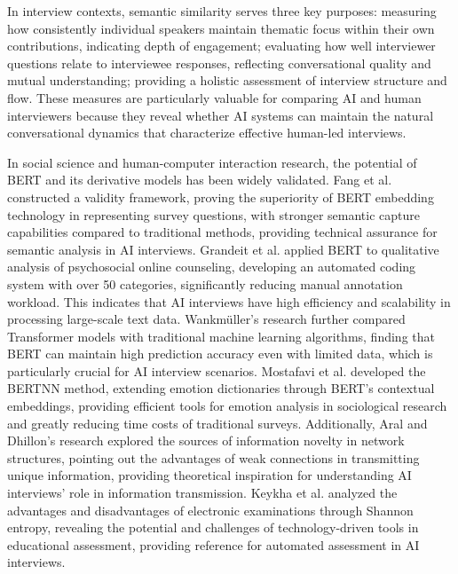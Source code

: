 \documentclass[sigchi,nonacm,manuscript]{acmart}
\begin{document}
In interview contexts, semantic similarity serves three key purposes: measuring how consistently individual speakers maintain thematic focus within their own contributions, indicating depth of engagement; evaluating how well interviewer questions relate to interviewee responses, reflecting conversational quality and mutual understanding; providing a holistic assessment of interview structure and flow. These measures are particularly valuable for comparing AI and human interviewers because they reveal whether AI systems can maintain the natural conversational dynamics that characterize effective human-led interviews.

In social science and human-computer interaction research, the potential of BERT and its derivative models has been widely validated. Fang et al. \citep{fangEvaluatingConstructValidity2022} constructed a validity framework, proving the superiority of BERT embedding technology in representing survey questions, with stronger semantic capture capabilities compared to traditional methods, providing technical assurance for semantic analysis in AI interviews. Grandeit et al. \citep{grandeitUsingBERTQualitative2020} applied BERT to qualitative analysis of psychosocial online counseling, developing an automated coding system with over 50 categories, significantly reducing manual annotation workload. This indicates that AI interviews have high efficiency and scalability in processing large-scale text data. Wankmüller's \citep{wankmullerIntroductionNeuralTransfer2021} research further compared Transformer models with traditional machine learning algorithms, finding that BERT can maintain high prediction accuracy even with limited data, which is particularly crucial for AI interview scenarios. Mostafavi et al. \citep{mostafaviContextualEmbeddingsSociological2025} developed the BERTNN method, extending emotion dictionaries through BERT's contextual embeddings, providing efficient tools for emotion analysis in sociological research and greatly reducing time costs of traditional surveys. Additionally, Aral and Dhillon's \citep{aralWhatExactlyNovelty2023} research explored the sources of information novelty in network structures, pointing out the advantages of weak connections in transmitting unique information, providing theoretical inspiration for understanding AI interviews' role in information transmission. Keykha et al. \citep{keykhaAdvantagesChallengesElectronic2025} analyzed the advantages and disadvantages of electronic examinations through Shannon entropy, revealing the potential and challenges of technology-driven tools in educational assessment, providing reference for automated assessment in AI interviews.
\end{document}
